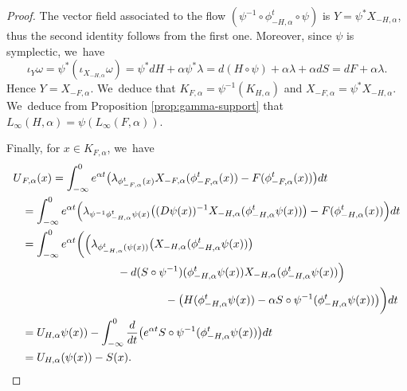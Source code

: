\documentclass[10pt]{amsart}
\theoremstyle{definition}
\begin{document}
\begin{proof} The vector field associated to the flow $(\psi^{-1}\circ \phi^t_{-H, \alpha}\circ \psi)$ is $Y=\psi^*X_{-H,\alpha}$, thus the second identity follows from the first one. Moreover, since $\psi$ is symplectic, we~have\vspace*{-3pt}
\begin{equation*}\iota_Y\omega=\psi^*(\iota_{X_{-H,\alpha}}\omega)=\psi^*dH+\alpha\psi^*\lambda=d(H\circ\psi)+\alpha\lambda +\alpha dS=dF+\alpha\lambda.
\end{equation*}
Hence $Y=X_{-F, \alpha}$. We~deduce that $K_{F,\alpha}=\psi^{-1}(K_{H,\alpha})$ and $X_{-F,\alpha}=\psi^*X_{-H,\alpha}$. We~deduce from Proposition \ref{prop:gamma-support} that $L_\infty(H, \alpha)=\psi(L_\infty(F, \alpha))$.

Finally, for $x\in K_{F,\alpha}$, we~have
\begin{align*}
U&{}_{F, \alpha}(x)=\int_{-\infty}^0e^{\alpha t}\bigl(\lambda_{\phi^t_{-F,\alpha}(x)}X_{-F,\alpha} (\phi_{-F,\alpha}^t(x))-F(\phi^t_{-F,\alpha}(x))\bigr)dt\\
&=\int_{-\infty}^0e^{\alpha t}\Bigl(\lambda_{\psi^{-1}\phi^t_{-H,\alpha} \psi(x)}\bigl((D\psi(x))^{-1}X_{-H,\alpha}(\phi^t_{-H, \alpha} \psi(x))\bigr)-F(\phi^t_{-H,\alpha}(x))\Bigr)dt\\
&=\int_{-\infty}^0e^{\alpha t}
\biggl(
\Bigl(\lambda_{\phi^t_{-H,\alpha}(\psi(x))}
\bigl(X_{-H,\alpha} (\phi^t_{-H,\alpha}\psi(x))\bigr)\\
&\hspace*{3cm}-d(S\circ \psi^{-1})(\phi^t_{-H, \alpha} \psi(x))X_{-H,\alpha} (\phi^t_{-H,\alpha}\psi(x))\Bigr)\\
&\hspace*{4.5cm} -\bigl(H(\phi^t_{-H, \alpha}\psi(x))-\alpha S\circ\psi^{-1}(\phi^t_{-H,\alpha} \psi(x))\bigr)\biggr)dt\\
&=U_{H, \alpha}\psi(x))-\int_{-\infty}^0\frac{d}{dt}\bigl(e^{\alpha t}S\circ\psi^{-1}(\phi^t_{-H,\alpha}\psi(x))\bigr)dt\\
&=U_{H,\alpha}(\psi(x))-S(x).\qedhere
\end{align*}
\end{proof}
\end{document}

